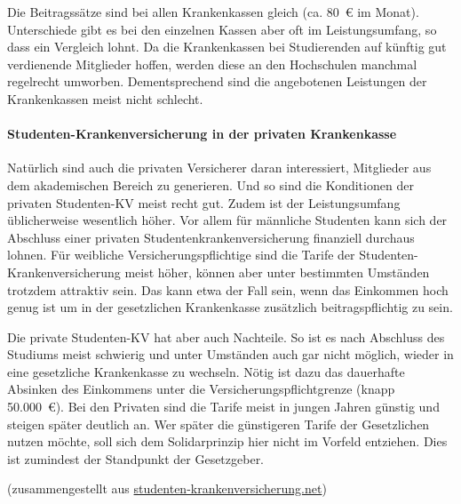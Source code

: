 Die Beitragssätze sind bei allen Krankenkassen gleich (ca. 80~€ im
Monat). Unterschiede gibt es bei den einzelnen Kassen aber oft im
Leistungsumfang, so dass ein Vergleich lohnt. Da die Krankenkassen bei
Studierenden auf künftig gut verdienende Mitglieder hoffen, werden
diese an den Hochschulen manchmal regelrecht umworben. Dementsprechend
sind die angebotenen Leistungen der Krankenkassen meist nicht
schlecht.

\paragraph{Studenten-Krankenversicherung in der privaten Krankenkasse}

Natürlich sind auch die privaten Versicherer daran interessiert,
Mitglieder aus dem akademischen Bereich zu generieren. Und so sind die
Konditionen der privaten Studenten-KV meist recht gut. Zudem ist der
Leistungsumfang üblicherweise wesentlich höher. Vor allem für
männliche Studenten kann sich der Abschluss einer privaten
Studentenkrankenversicherung finanziell durchaus lohnen. Für weibliche
Versicherungspflichtige sind die Tarife der
Studenten-Krankenversicherung meist höher, können aber unter
bestimmten Umständen trotzdem attraktiv sein. Das kann etwa der Fall
sein, wenn das Einkommen hoch genug ist um in der gesetzlichen
Krankenkasse zusätzlich beitragspflichtig zu sein.

Die private Studenten-KV hat aber auch Nachteile. So ist es nach
Abschluss des Studiums meist schwierig und unter Umständen auch gar
nicht möglich, wieder in eine gesetzliche Krankenkasse zu
wechseln. Nötig ist dazu das dauerhafte Absinken des Einkommens unter
die Versicherungspflichtgrenze (knapp 50.000~€). Bei den Privaten sind
die Tarife meist in jungen Jahren günstig und steigen später deutlich
an. Wer später die günstigeren Tarife der Gesetzlichen nutzen möchte,
soll sich dem Solidarprinzip hier nicht im Vorfeld entziehen. Dies ist
zumindest der Standpunkt der Gesetzgeber.

\footnotesize (zusammengestellt aus {\url{studenten-krankenversicherung.net}})
\normalsize
